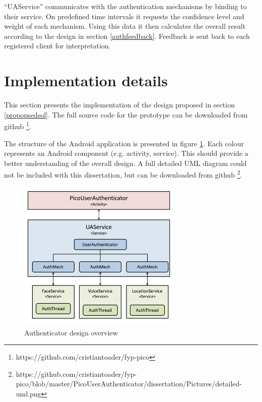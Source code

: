 ``UAService'' communicates with the authentication mechanisms by binding to their service. On predefined time intervals it requests the confidence level and weight of each mechanism. Using this data it then calculates the overall result according to the design in section \ref{authfeedback}. Feedback is sent back to each registered client for interpretation.

\section{Implementation details}
This section presents the implementation of the design proposed in section \ref{propopsedsol}. The full source code for the prototype can be downloaded from github \footnote{https://github.com/cristiantoader/fyp-pico}. 

The structure of the Android application is presented in figure \ref{fig:overview}. Each colour represents an Android component (e.g. activity, service). This should provide a better understanding of the overall design. A full detailed UML diagram could not be included with this dissertation, but can be downloaded from github \footnote{https://github.com/cristiantoader/fyp-pico/blob/master/PicoUserAuthenticator/dissertation/Pictures/detailed-uml.png}.
\begin{figure}[h]
    \centering
    \includegraphics[width=0.7\textwidth]{Pictures/overview-uml}
    \caption{Authenticator design overview}
    \label{fig:overview}
\end{figure}

